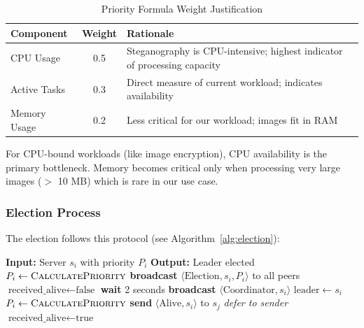 \documentclass[12pt,a4paper]{article}
\begin{document}
\begin{table}[h]
\centering
\caption{Priority Formula Weight Justification}
\label{tab:weights}
\begin{tabular}{@{}lcp{8cm}@{}}
\toprule
\textbf{Component} & \textbf{Weight} & \textbf{Rationale} \\
\midrule
CPU Usage & 0.5 & Steganography is CPU-intensive; highest indicator of processing capacity \\
Active Tasks & 0.3 & Direct measure of current workload; indicates availability \\
Memory Usage & 0.2 & Less critical for our workload; images fit in RAM \\
\bottomrule
\end{tabular}
\end{table}

For CPU-bound workloads (like image encryption), CPU availability is the primary bottleneck. Memory becomes critical only when processing very large images ($>$ 10 MB) which is rare in our use case.

\subsubsection{Election Process}

The election follows this protocol (see Algorithm~\ref{alg:election}):

\begin{algorithm}[h]
\caption{Modified Bully Election with Load-Based Priority}
\label{alg:election}
\begin{algorithmic}[1]
\State \textbf{Input:} Server $s_i$ with priority $P_i$
\State \textbf{Output:} Leader elected
    \State $P_i \gets \Call{CalculatePriority}{}$ 
    \State \textbf{broadcast} $\langle\text{Election}, s_i, P_i\rangle$ to all peers
    \State $\text{received\_alive} \gets \text{false}$
    \State \textbf{wait} 2 seconds
        \State \textbf{broadcast} $\langle\text{Coordinator}, s_i\rangle$
        \State $\text{leader} \gets s_i$
    \EndIf
\EndProcedure
\State
{}
    \State $P_i \gets \Call{CalculatePriority}{}$
     
        \State \textbf{send} $\langle\text{Alive}, s_i\rangle$ to $s_j$
        \State {} 
    \Else
        \State \textit{defer to sender} 
    \EndIf
\EndProcedure
\State
{}
    \State $\text{received\_alive} \gets \text{true}$ 
\EndProcedure
\end{algorithmic}
\end{algorithm}
\end{document}
